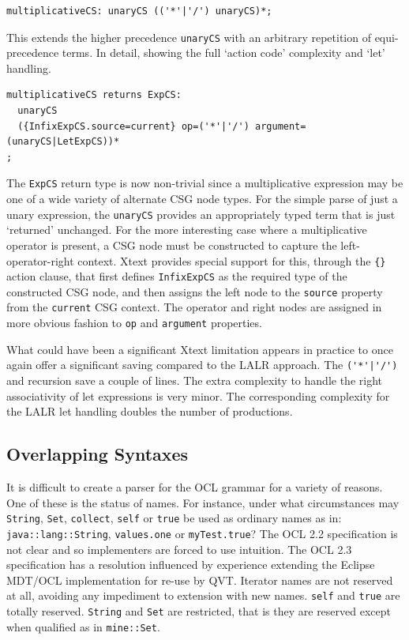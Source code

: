 \documentclass[runningheads,a4paper]{llncs}
\begin{document}
{\small\begin{verbatim}
multiplicativeCS: unaryCS (('*'|'/') unaryCS)*;
\end{verbatim}}

This extends the higher precedence \verb+unaryCS+ with an arbitrary repetition of equi-precedence terms. In detail, showing the full `action code' complexity and `let' handling.

{\small\begin{verbatim}
multiplicativeCS returns ExpCS:
  unaryCS
  ({InfixExpCS.source=current} op=('*'|'/') argument=(unaryCS|LetExpCS))*
;
\end{verbatim}}

The \verb+ExpCS+ return type is now non-trivial since a multiplicative expression may be one of a wide variety of alternate CSG node types. For the simple parse of just a unary expression, the \verb+unaryCS+ provides an appropriately typed term that is just `returned' unchanged. For the more interesting case where a multiplicative operator is present, a CSG node must be constructed to capture the left-operator-right context. Xtext provides special support for this, through the \verb+{}+ action clause, that first defines \verb+InfixExpCS+ as the required type of the constructed CSG node, and then assigns the left node to the \verb+source+ property from the \verb+current+ CSG context. The operator and right nodes are assigned in more obvious fashion to \verb+op+ and \verb+argument+ properties.

What could have been a significant Xtext limitation appears in practice to once again offer a significant saving compared to the LALR approach. The \verb+('*'|'/')+ and recursion save a couple of lines. The extra complexity to handle the right associativity of let expressions is very minor. The corresponding complexity for the LALR let handling doubles the number of productions.

\subsection{Overlapping Syntaxes}

It is difficult to create a parser for the OCL grammar for a variety of reasons. One of these is the status of names. For instance, under what circumstances may \verb+String+,  \verb+Set+,  \verb+collect+, \verb+self+ or \verb+true+ be used as ordinary names as in: \verb+java::lang::String+, \verb+values.one+ or \verb+myTest.true+? The OCL 2.2 specification is not clear and so implementers are forced to use intuition. The OCL 2.3 specification has a resolution influenced by experience extending the Eclipse MDT/OCL implementation for re-use by QVT. Iterator names are not reserved at all, avoiding any impediment to extension with new names. \verb+self+ and \verb+true+ are totally reserved. \verb+String+ and \verb+Set+ are restricted, that is they are reserved except when qualified as in \verb+mine::Set+.
\end{document}
